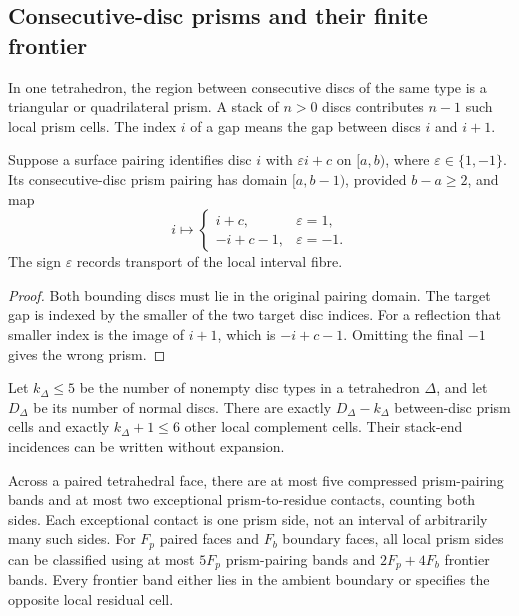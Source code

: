 \subsection{Consecutive-disc prisms and their finite frontier}

In one tetrahedron, the region between consecutive discs of the same type
is a triangular or quadrilateral prism. A stack of $n>0$ discs contributes
$n-1$ such local prism cells. The index $i$ of a gap means the gap between
discs $i$ and $i+1$.

\begin{lemma}
\label{lem:normal-reflected-gap}
Suppose a surface pairing identifies disc $i$ with
$\varepsilon i+c$ on $[a,b)$, where $\varepsilon\in\{1,-1\}$.
Its consecutive-disc prism pairing has domain $[a,b-1)$, provided
$b-a\ge2$, and map
\[
 i\longmapsto
 \begin{cases}
  i+c,&\varepsilon=1,\\
  -i+c-1,&\varepsilon=-1.
 \end{cases}
\]
The sign $\varepsilon$ records transport of the local interval fibre.
\end{lemma}
\begin{proof}
Both bounding discs must lie in the original pairing domain. The target
gap is indexed by the smaller of the two target disc indices. For a
reflection that smaller index is the image of $i+1$, which is
$-i+c-1$. Omitting the final $-1$ gives the wrong prism.
\end{proof}

\begin{theorem}
\label{thm:normal-residue}
Let $k_\Delta\le5$ be the number of nonempty disc types in a tetrahedron
$\Delta$, and let $D_\Delta$ be its number of normal discs.
There are exactly $D_\Delta-k_\Delta$ between-disc prism cells and exactly
$k_\Delta+1\le6$ other local complement cells. Their stack-end incidences
can be written without expansion.

Across a paired tetrahedral face, there are at most five compressed
prism-pairing bands and at most two exceptional prism-to-residue contacts,
counting both sides. Each exceptional contact is one prism side, not an
interval of arbitrarily many such sides. For $F_p$ paired faces and $F_b$
boundary faces, all local prism sides can be classified using at most
$5F_p$ prism-pairing bands and $2F_p+4F_b$ frontier bands. Every frontier
band either lies in the ambient boundary or specifies the opposite local
residual cell.
\end{theorem}

